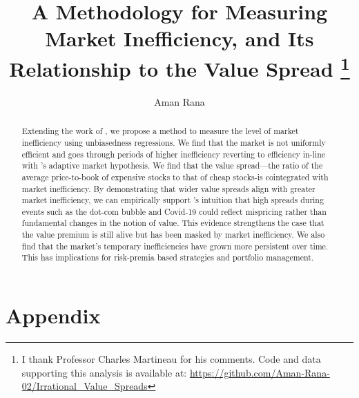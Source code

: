 \documentclass[11pt,a4paper,english]{article}
\date{\displaydate{date}}
\title{A Methodology for Measuring Market Inefficiency, and Its Relationship to the Value Spread 
\thanks{I thank Professor Charles Martineau for his comments. Code and data supporting this analysis is available at: \url{https://github.com/Aman-Rana-02/Irrational_Value_Spreads}}}
\author{%
  Aman Rana\\
}
\begin{document}
  \maketitle

  \begin{abstract}
    \noindent Extending the work of \citet{boguth_2023}, we propose a method to measure the level of market inefficiency using unbiasedness regressions.
    We find that the market is not uniformly efficient and goes through periods of higher inefficiency reverting to efficiency in-line with \citet{lo_amh}'s adaptive 
    market hypothesis. We find that the value spread—the ratio of the average price-to-book of expensive stocks to that of cheap stocks-is cointegrated with market inefficiency. 
    By demonstrating that wider value spreads align with greater market inefficiency, we can empirically support \citet{asness_2024}'s intuition 
    that high spreads during events such as the dot-com bubble and Covid-19 could reflect mispricing rather than fundamental changes in the notion of value. 
    This evidence strengthens the case that the value premium is still alive but has been masked by market inefficiency. 
    We also find that the market's temporary inefficiencies have grown more persistent over time. This has implications for risk-premia based strategies and portfolio management.
  \end{abstract}

  \newpage
  \tableofcontents

  \newpage
  

  \newpage
  

  
  
  \newpage
  

  \newpage
  

  \newpage
  
  

  \section*{Appendix}
  \renewcommand{\thesection}{\Alph{section}}
  \setcounter{section}{0}
  
\end{document}
